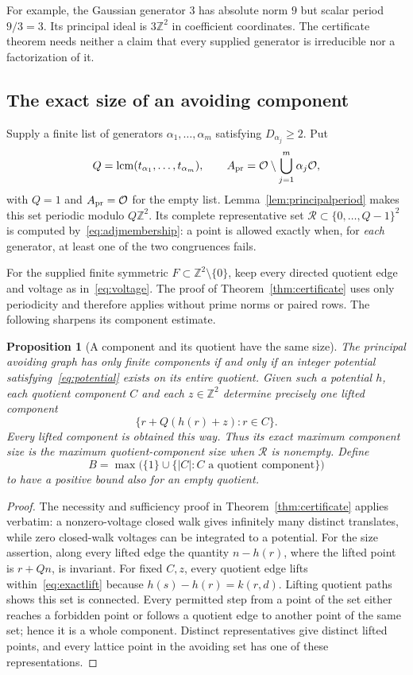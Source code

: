 \documentclass[11pt]{article}
\numberwithin{equation}{section}
\newtheorem{proposition}[theorem]{Proposition}
\theoremstyle{definition}\newtheorem{definition}[theorem]{Definition}
\theoremstyle{remark}\newtheorem{remark}[theorem]{Remark}
\newcommand{\Z}{\mathbb Z}\newcommand{\Q}{\mathbb Q}\newcommand{\R}{\mathbb R}
\newcommand{\OO}{\mathcal O}\newcommand{\PP}{\mathcal P}
\newcommand{\abs}[1]{\lvert #1\rvert}
\begin{document}
For example, the Gaussian generator $3$ has absolute norm $9$ but scalar period $9/3=3$. Its principal ideal is $3\Z^2$ in coefficient coordinates. The certificate theorem needs neither a claim that every supplied generator is irreducible nor a factorization of it.

\subsection{The exact size of an avoiding component}

Supply a finite list of generators $\alpha_1,\ldots,\alpha_m$ satisfying $D_{\alpha_j}\ge2$. Put
\[
 Q=\operatorname{lcm}(t_{\alpha_1},\ldots,t_{\alpha_m}),
 \qquad
 A_{\rm pr}=\OO\setminus\bigcup_{j=1}^m\alpha_j\OO,
\]
with $Q=1$ and $A_{\rm pr}=\OO$ for the empty list. Lemma~\ref{lem:principalperiod} makes this set periodic modulo $Q\Z^2$. Its complete representative set $\mathcal R\subset\{0,\ldots,Q-1\}^2$ is computed by~\eqref{eq:adjmembership}: a point is allowed exactly when, for \emph{each} generator, at least one of the two congruences fails.

For the supplied finite symmetric $F\subset\Z^2\setminus\{0\}$, keep every directed quotient edge and voltage as in~\eqref{eq:voltage}. The proof of Theorem~\ref{thm:certificate} uses only periodicity and therefore applies without prime norms or paired rows. The following sharpens its component estimate.

\begin{proposition}[A component and its quotient have the same size]\label{prop:exactquotientsize}
The principal avoiding graph has only finite components if and only if an integer potential satisfying~\eqref{eq:potential} exists on its entire quotient. Given such a potential $h$, each quotient component $C$ and each $z\in\Z^2$ determine precisely one lifted component
\begin{equation}\label{eq:exactlift}
 \{r+Q(h(r)+z):r\in C\}.
\end{equation}
Every lifted component is obtained this way. Thus its exact maximum component size is the maximum quotient-component size when $\mathcal R$ is nonempty. Define
\[
 B=\max\bigl(\{1\}\cup\{\abs C:C\text{ a quotient component}\}\bigr)
\]
to have a positive bound also for an empty quotient.
\end{proposition}
\begin{proof}
The necessity and sufficiency proof in Theorem~\ref{thm:certificate} applies verbatim: a nonzero-voltage closed walk gives infinitely many distinct translates, while zero closed-walk voltages can be integrated to a potential. For the size assertion, along every lifted edge the quantity $n-h(r)$, where the lifted point is $r+Qn$, is invariant. For fixed $C,z$, every quotient edge lifts within~\eqref{eq:exactlift} because $h(s)-h(r)=k(r,d)$. Lifting quotient paths shows this set is connected. Every permitted step from a point of the set either reaches a forbidden point or follows a quotient edge to another point of the same set; hence it is a whole component. Distinct representatives give distinct lifted points, and every lattice point in the avoiding set has one of these representations.
\end{proof}
\end{document}
